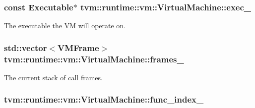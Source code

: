 \subsubsection[{\texorpdfstring{exec\+\_\+}{exec_}}]{\setlength{\rightskip}{0pt plus 5cm}const {\bf Executable}$\ast$ tvm\+::runtime\+::vm\+::\+Virtual\+Machine\+::exec\+\_\+\hspace{0.3cm}{\ttfamily [protected]}}\hypertarget{classtvm_1_1runtime_1_1vm_1_1VirtualMachine_ad478992798013d0e3a72d220003c8881}{}\label{classtvm_1_1runtime_1_1vm_1_1VirtualMachine_ad478992798013d0e3a72d220003c8881}


The executable the VM will operate on. 

\subsubsection[{\texorpdfstring{frames\+\_\+}{frames_}}]{\setlength{\rightskip}{0pt plus 5cm}std\+::vector$<${\bf V\+M\+Frame}$>$ tvm\+::runtime\+::vm\+::\+Virtual\+Machine\+::frames\+\_\+\hspace{0.3cm}{\ttfamily [protected]}}\hypertarget{classtvm_1_1runtime_1_1vm_1_1VirtualMachine_a4a268dec17fdd0942fe7dce78974783f}{}\label{classtvm_1_1runtime_1_1vm_1_1VirtualMachine_a4a268dec17fdd0942fe7dce78974783f}


The current stack of call frames. 

\subsubsection[{\texorpdfstring{func\+\_\+index\+\_\+}{func_index_}}]{ tvm\+::runtime\+::vm\+::\+Virtual\+Machine\+::func\+\_\+index\+\_\+\hspace{0.3cm}{\ttfamily [protected]}}\hypertarget{classtvm_1_1runtime_1_1vm_1_1VirtualMachine_af9d51023b5d6451dac20d1a146ce5d38}{}\label{classtvm_1_1runtime_1_1vm_1_1VirtualMachine_af9d51023b5d6451dac20d1a146ce5d38}


